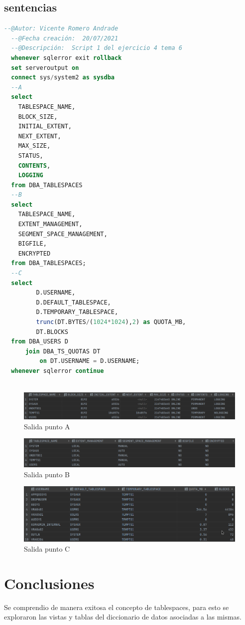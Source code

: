 \documentclass[journal]{IEEEtran}
\begin{document}
\subsection{sentencias}
\begin{lstlisting}[language=sql, caption=s-00-consulta-tablespaces.sql,label={lst:codigo1}]
  --@Autor: Vicente Romero Andrade
  --@Fecha creación:  20/07/2021
  --@Descripción:  Script 1 del ejercicio 4 tema 6
  whenever sqlerror exit rollback
  set serveroutput on
  connect sys/system2 as sysdba
  --A
  select
    TABLESPACE_NAME,
    BLOCK_SIZE,
    INITIAL_EXTENT,
    NEXT_EXTENT,
    MAX_SIZE,
    STATUS,
    CONTENTS,
    LOGGING
  from DBA_TABLESPACES
  --B
  select
    TABLESPACE_NAME,
    EXTENT_MANAGEMENT,
    SEGMENT_SPACE_MANAGEMENT,
    BIGFILE,
    ENCRYPTED
  from DBA_TABLESPACES;
  --C
  select
         D.USERNAME,
         D.DEFAULT_TABLESPACE,
         D.TEMPORARY_TABLESPACE,
         trunc(DT.BYTES/(1024*1024),2) as QUOTA_MB,
         DT.BLOCKS
  from DBA_USERS D
      join DBA_TS_QUOTAS DT
          on DT.USERNAME = D.USERNAME;
  whenever sqlerror continue
  
\end{lstlisting}
\begin{figure}[H]
  \centering
  \includegraphics[scale=.22]{captura_1.png}
   \caption{Salida punto A}
   \label{fig:validador_1}
\end{figure}
\begin{figure}[H]
  \centering
  \includegraphics[scale=.22]{captura_2.png}
   \caption{Salida punto B}
   \label{fig:validador_2}
\end{figure}
\begin{figure}[H]
  \centering
  \includegraphics[scale=.22]{captura_3.png}
   \caption{Salida punto C}
   \label{fig:validador_3}
\end{figure}

\section{Conclusiones}
Se comprendio de manera exitosa el concepto de tablespaces, para esto se exploraron las vistas y 
tablas del diccionario de datos asociadas a las mismas.
\ifCLASSOPTIONcaptionsoff
  \newpage

\fi
\end{document}
